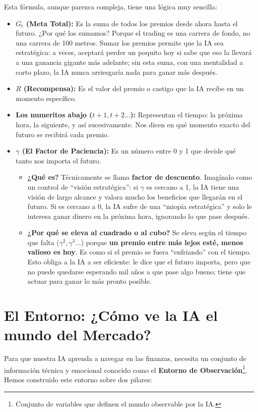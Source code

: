 \documentclass[12pt,a4paper]{article}
\begin{document}
Esta fórmula, aunque parezca compleja, tiene una lógica muy sencilla:
\begin{itemize}
    \item \textbf{$G_t$ (Meta Total):} Es la suma de todos los premios desde ahora hasta el futuro. ¿Por qué los sumamos? Porque el trading es una carrera de fondo, no una carrera de 100 metros. Sumar los premios permite que la IA sea estratégica: a veces, aceptará perder un poquito hoy si sabe que eso la llevará a una ganancia gigante más adelante; sin esta suma, con una mentalidad a corto plazo, la IA nunca arriesgaría nada para ganar más después.
    \item \textbf{$R$ (Recompensa):} Es el valor del premio o castigo que la IA recibe en un momento específico.
    \item \textbf{Los numeritos abajo ($t+1, t+2 \dots$):} Representan el tiempo: la próxima hora, la siguiente, y así sucesivamente. Nos dicen en qué momento exacto del futuro se recibirá cada premio.
    \item \textbf{$\gamma$ (El Factor de Paciencia):} Es un número entre 0 y 1 que decide qué tanto nos importa el futuro. 
    \begin{itemize}
        \item \textbf{¿Qué es?} Técnicamente se llama \textbf{factor de descuento}. Imagínalo como un control de ``visión estratégica'': si $\gamma$ es cercano a 1, la IA tiene una visión de largo alcance y valora mucho los beneficios que llegarán en el futuro. Si es cercano a 0, la IA sufre de una ``miopía estratégica'' y solo le interesa ganar dinero en la próxima hora, ignorando lo que pase después.
        \item \textbf{¿Por qué se eleva al cuadrado o al cubo?} Se eleva según el tiempo que falta ($\gamma^2, \gamma^3 \dots$) porque \textbf{un premio entre más lejos esté, menos valioso es hoy}. Es como si el premio se fuera ``enfriando'' con el tiempo. Esto obliga a la IA a ser eficiente: le dice que el futuro importa, pero que no puede quedarse esperando mil años a que pase algo bueno; tiene que actuar para ganar lo más pronto posible.
    \end{itemize}
\end{itemize}

\section{El Entorno: ¿Cómo ve la IA el mundo del Mercado?}

Para que nuestra IA aprenda a navegar en las finanzas, necesita un conjunto de información técnica y emocional conocido como el \textbf{Entorno de Observación}\footnote{Conjunto de variables que definen el mundo observable por la IA.}. Hemos construido este entorno sobre dos pilares:
\end{document}
